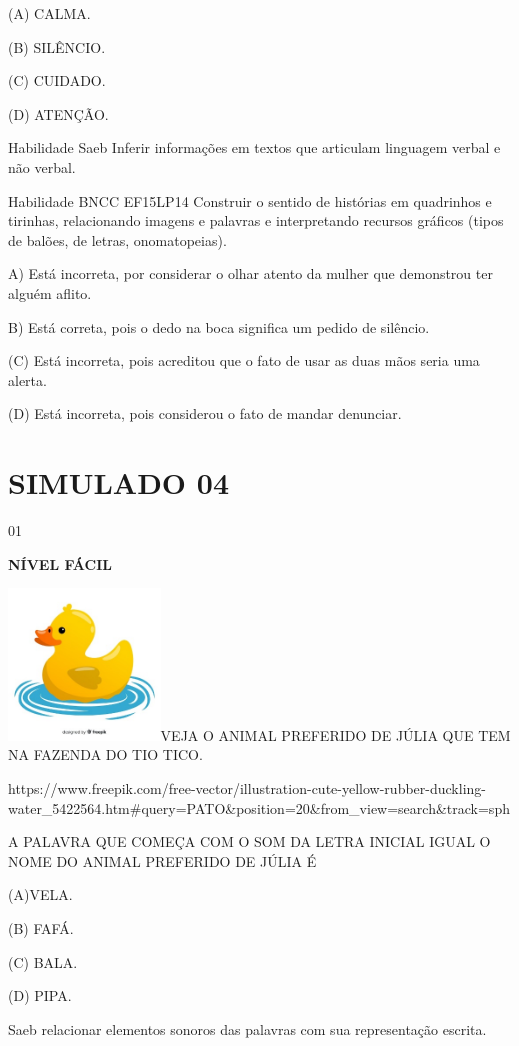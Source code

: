 {{(A) CALMA.

(B) SILÊNCIO.

(C) CUIDADO.

(D) ATENÇÃO.

Habilidade Saeb Inferir informações em textos que articulam linguagem
verbal e não verbal.

Habilidade BNCC EF15LP14 Construir o sentido de histórias em quadrinhos
e tirinhas, relacionando imagens e palavras e interpretando recursos
gráficos (tipos de balões, de letras, onomatopeias).

A) Está incorreta, por considerar o olhar atento da mulher que
demonstrou ter alguém aflito.

B) Está correta, pois o dedo na boca significa um pedido de silêncio.

(C) Está incorreta, pois acreditou que o fato de usar as duas mãos seria
uma alerta.

(D) Está incorreta, pois considerou o fato de mandar denunciar.

\section{SIMULADO 04}

\num{01}

\textbf{NÍVEL FÁCIL}

\includegraphics[width=1.58974in,height=1.58974in]{media/image174.jpeg}VEJA
O ANIMAL PREFERIDO DE JÚLIA QUE TEM NA FAZENDA DO TIO TICO.

https://www.freepik.com/free-vector/illustration-cute-yellow-rubber-duckling-water\_5422564.htm\#query=PATO\&position=20\&from\_view=search\&track=sph

A PALAVRA QUE COMEÇA COM O SOM DA LETRA INICIAL IGUAL O NOME DO ANIMAL
PREFERIDO DE JÚLIA É

(A)VELA.

(B) FAFÁ.

(C) BALA.

(D) PIPA.

Saeb relacionar elementos sonoros das palavras com sua representação
escrita.

}}
